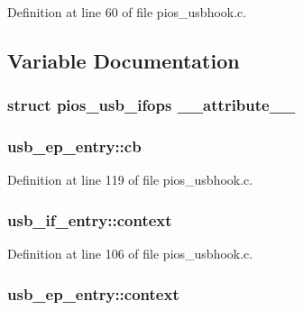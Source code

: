 Definition at line 60 of file pios\-\_\-usbhook.\-c.



\subsection{Variable Documentation}
\hypertarget{group___p_i_o_s___u_s_b_h_o_o_k_gaefc540229d1ad4829fb317812135c7b4}{
\subsubsection[{\-\_\-\-\_\-attribute\-\_\-\-\_\-}]{\setlength{\rightskip}{0pt plus 5cm}struct {\bf pios\-\_\-usb\-\_\-ifops}  {\bf \-\_\-\-\_\-attribute\-\_\-\-\_\-}}}\label{group___p_i_o_s___u_s_b_h_o_o_k_gaefc540229d1ad4829fb317812135c7b4}
\hypertarget{group___p_i_o_s___u_s_b_h_o_o_k_gaf0106468de445de05247315a6001789c}{
\subsubsection[{cb}]{ usb\-\_\-ep\-\_\-entry\-::cb}}\label{group___p_i_o_s___u_s_b_h_o_o_k_gaf0106468de445de05247315a6001789c}


Definition at line 119 of file pios\-\_\-usbhook.\-c.

\hypertarget{group___p_i_o_s___u_s_b_h_o_o_k_gad9a6d740530f937ee0fd2870b5c02ce8}{
\subsubsection[{context}]{ usb\-\_\-if\-\_\-entry\-::context}}\label{group___p_i_o_s___u_s_b_h_o_o_k_gad9a6d740530f937ee0fd2870b5c02ce8}


Definition at line 106 of file pios\-\_\-usbhook.\-c.

\hypertarget{group___p_i_o_s___u_s_b_h_o_o_k_ga044e4671681d96fdf1918abb9e52542e}{
\subsubsection[{context}]{ usb\-\_\-ep\-\_\-entry\-::context}}\label{group___p_i_o_s___u_s_b_h_o_o_k_ga044e4671681d96fdf1918abb9e52542e}


